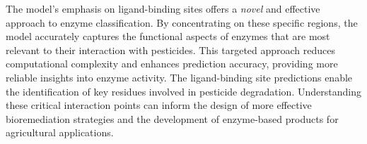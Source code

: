 The model's emphasis on ligand-binding sites offers a \textit{novel} and effective approach to enzyme classification. By concentrating on these specific regions, the model accurately captures the functional aspects of enzymes that are most relevant to their interaction with pesticides. This targeted approach reduces computational complexity and enhances prediction accuracy, providing more reliable insights into enzyme activity. The ligand-binding site predictions enable the identification of key residues involved in pesticide degradation. Understanding these critical interaction points can inform the design of more effective bioremediation strategies and the development of enzyme-based products for agricultural applications. 